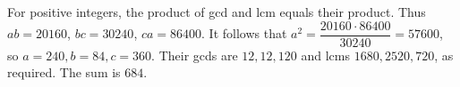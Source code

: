 For positive integers, the product of gcd and lcm equals their product. Thus $ab=20160$, $bc=30240$, $ca=86400$. It follows that $a^2=\dfrac{20160\cdot86400}{30240}=57600$, so $a=240,b=84,c=360$. Their gcds are $12,12,120$ and lcms $1680,2520,720$, as required. The sum is $\boxed{684}$.
